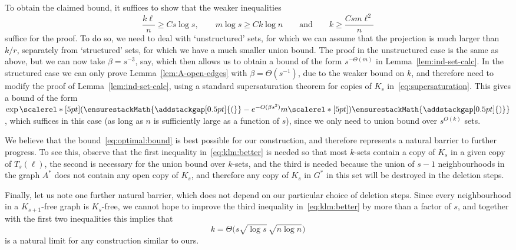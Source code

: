 \documentclass[12pt,reqno]{amsart}
\newcommand\pig[1]{\scalerel*[5pt]{\normalsize#1}{%
  \ensurestackMath{\addstackgap[0.5pt]{\normalsize#1}}}}
\theoremstyle{remark}
\numberwithin{theorem}{section}
\renewcommand{\(}{\bigl(}
\renewcommand{\)}{\bigr)\vphantom{)}}
\renewcommand{\ge}{\geqslant}
\begin{document}
To obtain the claimed bound, it suffices to show that the weaker inequalities 
\begin{equation}\label{eq:klm:better}
\frac{k \ell}{n} \ge C s \log s, \qquad m \log s \ge C k \log n \qquad \text{and} \qquad k \ge \frac{C s m \ell^2}{n}
\end{equation}
suffice for the proof. To do so, we need to deal with `unstructured' sets, for which we can assume that the projection is much larger than $k/r$, separately from `structured' sets, for which we have a much smaller union bound. %
The proof in the unstructured case is the same as above, but we can now take $\beta = s^{-3}$, say, which then allows us to obtain a bound of the form $s^{-\Theta(m)}$ in Lemma~\ref{lem:ind-set-calc}. In the structured case we can only prove Lemma~\ref{lem:A-open-edges} with $\beta = \Theta(s^{-1})$, due to the weaker bound on $k$, and therefore need to modify the proof of Lemma~\ref{lem:ind-set-calc}, using a standard supersaturation theorem for copies of $K_s$ in~\eqref{eq:supersaturation}. This gives a bound of the form $\exp\pig( - e^{-O(\beta s^2)} m \pig)$, which suffices in this case (as long as $n$ is sufficiently large as a function of $s$), since we only need to union bound over $s^{O(k)}$ sets. 


We believe that the bound~\eqref{eq:optimal:bound} is best possible for our construction, and therefore represents a natural barrier to further progress. To see this, observe that the first inequality in~\eqref{eq:klm:better} is needed so that most $k$-sets contain a copy of $K_s$ in a given copy of $T_s(\ell)$, %
the second is necessary for the union bound over $k$-sets, and the third is needed because the union of $s - 1$ neighbourhoods in the graph $A^*$ does not contain any open copy of $K_s$, and therefore any copy of $K_s$ in $G^*$ in this set will be destroyed in the deletion steps. 

Finally, let us note one further natural barrier, which does not depend on our particular choice of deletion steps. Since every neighbourhood in a $K_{s+1}$-free graph is $K_s$-free, we cannot hope to improve the third inequality in~\eqref{eq:klm:better} by more than a factor of $s$, and together with the first two inequalities this implies that 
$$k = \Theta\big( s \sqrt{\log s} \, \sqrt{n \log n} \big)$$
is a natural limit for any construction similar to ours.
\end{document}
